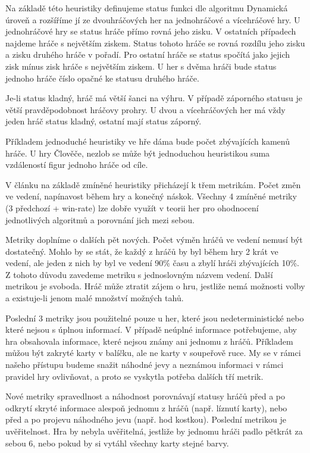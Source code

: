 Na základě této heuristiky definujeme status funkci dle algoritmu Dynamická úroveň\cite{24DynLev} a rozšíříme jí ze dvouhráčových her na jednohráčové a vícehráčové hry. U jednohráčové hry se status hráče přímo rovná jeho zisku. V ostatních případech najdeme hráče s největším ziskem. Status tohoto hráče se rovná rozdílu jeho zisku a zisku druhého hráče v pořadí. Pro ostatní hráče se status spočítá jako jejich zisk mínus zisk hráče s největším ziskem. U her s dvěma hráči bude status jednoho hráče číslo opačné ke statusu druhého hráče.

Je-li status kladný, hráč má větší šanci na výhru. V případě záporného statusu je větší pravděpodobnost hráčovy prohry. U dvou a vícehráčových her má vždy jeden hráč status kladný, ostatní mají status záporný.

Příkladem jednoduché heuristiky ve hře dáma bude počet zbývajících kamenů hráče. U hry Člověče, nezlob se může být jednoduchou heuristikou suma vzdáleností figur jednoho hráče od cíle.
 
V článku \cite{24DynLev} na základě zmíněné heuristiky přicházejí k třem metrikám. Počet změn ve vedení, napínavost během hry a konečný náskok. Všechny 4 zmíněné metriky (3 předchozí + win-rate) lze dobře využít v teorii her pro ohodnocení jednotlivých algoritmů a porovnání jich mezi sebou. 

Metriky doplníme o dalších pět nových. Počet výměn hráčů ve vedení nemusí být dostatečný. Mohlo by se stát, že každý z hráčů by byl během hry 2 krát ve vedení, ale jeden z nich by byl ve vedení 90\% času a zbylí hráči zbývajících 10\%. Z tohoto důvodu zavedeme metriku s jednoslovným názvem vedení. Další metrikou je svoboda. Hráč může ztratit zájem o hru, jestliže nemá možnosti volby a existuje-li jenom malé množství možných tahů.

Poslední 3 metriky jsou použitelné pouze u her, které jsou nedeterministické nebo které nejsou s úplnou informací. V případě neúplné informace potřebujeme, aby hra obsahovala informace, které nejsou známy ani jednomu z hráčů. Příkladem můžou být zakryté karty v balíčku, ale ne karty v soupeřově ruce. My se v rámci našeho přístupu budeme snažit náhodné jevy a neznámou informaci v rámci pravidel hry ovlivňovat, a proto se vyskytla potřeba dalších tří metrik.

Nové metriky spravedlnost a náhodnost porovnávají statusy hráčů před a po odkrytí skryté informace alespoň jednomu z hráčů (např. líznutí karty), nebo před a po projevu náhodného jevu (např. hod kostkou). Poslední metrikou je uvěřitelnost. Hra by nebyla uvěřitelná, jestliže by jednomu hráči padlo pětkrát za sebou 6, nebo pokud by si vytáhl všechny karty stejné barvy. 


